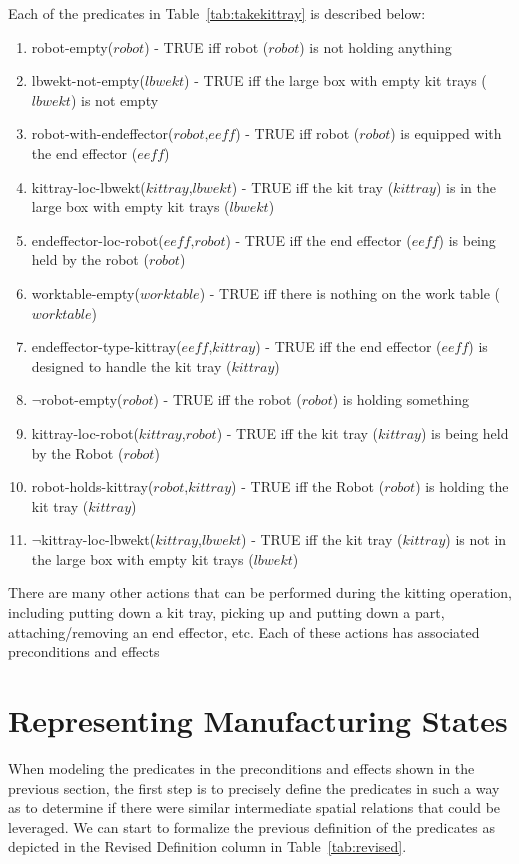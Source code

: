 \documentclass[preprint,12pt]{elsarticle}
\newcommand{\const}[1] {$\mathit{#1}$}
\newcommand{\stvar}[1] {\textsf{#1}}
\begin{document}
Each of the predicates in Table~\ref{tab:takekittray} is described below:
\begin{enumerate}
\item \stvar{robot-empty}(\const{robot}) - TRUE iff robot (\const{robot}) is not holding anything
\item \stvar{lbwekt-not-empty}(\const{lbwekt}) - TRUE iff the large box with empty kit trays (\const{lbwekt}) is not empty
\item \stvar{robot-with-endeffector}(\const{robot},\const{eeff}) - TRUE iff robot (\const{robot}) is equipped with the end effector (\const{eeff})
\item \stvar{kittray-loc-lbwekt}(\const{kittray},\const{lbwekt}) - TRUE iff the kit tray (\const{kittray}) is in the large box with empty kit trays (\const{lbwekt})
\item \stvar{endeffector-loc-robot}(\const{eeff},\const{robot}) - TRUE iff the end effector (\const{eeff}) is being held by the robot (\const{robot})
\item \stvar{worktable-empty}(\const{worktable}) - TRUE iff there is nothing on the work table (\const{worktable})
\item \stvar{endeffector-type-kittray}(\const{eeff},\const{kittray}) - TRUE iff the end effector (\const{eeff}) is designed to handle the kit tray (\const{kittray})
\item $\neg$\stvar{robot-empty}(\const{robot}) - TRUE iff the robot (\const{robot}) is holding something
\item \stvar{kittray-loc-robot}(\const{kittray},\const{robot}) - TRUE iff the kit tray (\const{kittray}) is being held by the Robot (\const{robot})
\item \stvar{robot-holds-kittray}(\const{robot},\const{kittray}) - TRUE iff the Robot (\const{robot}) is holding the kit tray (\const{kittray})
\item $\neg$\stvar{kittray-loc-lbwekt}(\const{kittray},\const{lbwekt}) - TRUE iff the kit tray (\const{kittray}) is not in the large box with empty kit trays (\const{lbwekt})
\end{enumerate}

There are many other actions that can be performed during the kitting operation, including putting down a kit tray, picking up and putting down a part, attaching/removing an end effector, etc. Each of these actions has associated preconditions and effects

\section{Representing Manufacturing States}\label{S:section4}
When modeling the predicates in the preconditions and effects shown in the previous section, the first step is to precisely define the predicates in such a way as to determine if there were similar intermediate spatial relations that could be leveraged. We can start to formalize the previous definition of the predicates as depicted in the Revised Definition column in Table~\ref{tab:revised}.
\end{document}

